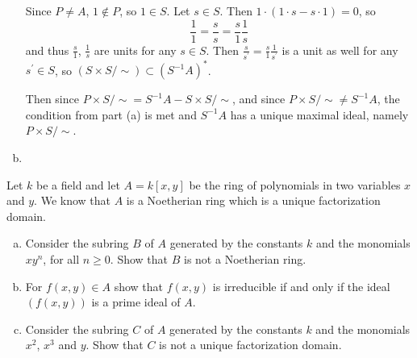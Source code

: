 \documentclass{article}
\newcounter{Problem}
\newenvironment{Problem}{\begin{Exercise}[name={Problem},
                                          counter={Problem}]}
                        {\end{Exercise}}
\begin{document}
\begin{Answer}
\begin{enumerate}[(a)]
{      Since $P \neq A$, $1 \notin P$, so $1 \in S$.
      Let $s \in S$. Then $1 \cdot (1 \cdot s - s \cdot 1) = 0$, so
       $$
       \frac{1}{1} = \frac{s}{s} = \frac{s}{1}\frac{1}{s}
       $$
      and thus $\frac{s}{1}$, $\frac{1}{s}$ are units for any $s \in
      S$. Then
      $
      \frac{s}{s^\prime} = \frac{s}{1}\frac{1}{s^\prime}
      $
      is a unit as well for any $s^\prime \in S$, so
      $(S \times S / \sim) \subset (S^{-1}A)^\ast$.

      Then since $P \times S / \sim = S^{-1} A - S \times S / \sim$,
      and since $P \times S / \sim \neq S^{-1} A$, the condition from
      part (a) is met and $S^{-1} A$ has a unique maximal ideal, namely
      $P \times S / \sim$.
    }
    \item{
    }
  \end{enumerate}
\end{Answer}

\pagebreak

\begin{Problem}
  Let $k$ be a field and let $A = k[x, y]$ be the ring of polynomials in
  two variables $x$ and $y$. We know that $A$ is a Noetherian ring which
  is a unique factorization domain.
  \begin{enumerate}[(a)]
    \item{
      Consider the subring $B$ of $A$ generated by the constants $k$
      and the monomials $xy^n$, for all $n \geq 0$. Show that $B$ is
      not a Noetherian ring.
    }
    \item{
      For $f(x, y) \in A$ show that $f(x, y)$ is irreducible if and
      only if the ideal $(f(x,y))$ is a prime ideal of $A$.
    }
    \item{
      Consider the subring $C$ of $A$ generated by the constants $k$
      and the monomials $x^2$, $x^3$ and $y$. Show that $C$ is not a
      unique factorization domain.
    }
  \end{enumerate}
\end{Problem}
\end{document}
